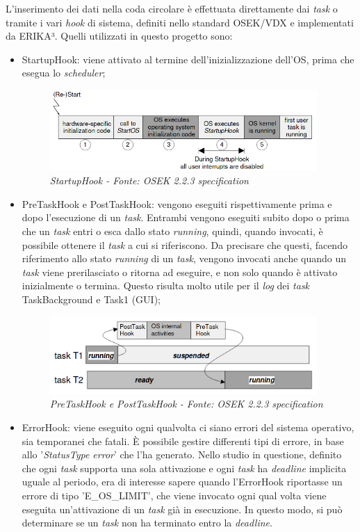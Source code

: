 \documentclass{article}
\begin{document}
L'inserimento dei dati nella coda circolare è effettuata direttamente dai \textit{task} o tramite i vari \textit{hook} di sistema, definiti nello standard OSEK/VDX e implementati da ERIKA³. Quelli utilizzati in questo progetto sono:
\begin{itemize}
	\item StartupHook: viene attivato al termine dell'inizializzazione dell'OS, prima che esegua lo \textit{scheduler};
	\begin{figure}[H]
		\centering
		\includegraphics[width=4in]{image/StartupHook.png}
		\caption{\textit{\textit{StartupHook} - Fonte: OSEK 2.2.3 specification}}
		\label{startup}
	\end{figure}
	\item PreTaskHook e PostTaskHook: vengono eseguiti rispettivamente prima e dopo l'esecuzione di un \textit{task}. Entrambi vengono eseguiti subito dopo o prima che un \textit{task} entri o esca dallo stato \textit{running}, quindi, quando invocati, è possibile ottenere il \textit{task} a cui si riferiscono. Da precisare che questi, facendo riferimento allo stato \textit{running} di un \textit{task}, vengono invocati anche quando un \textit{task} viene prerilasciato o ritorna ad eseguire, e non solo quando è attivato inizialmente o termina. Questo risulta molto utile per il \textit{log} dei \textit{task} TaskBackground e Task1 (GUI);
	\begin{figure}[H]
		\centering
		\includegraphics[width=4in]{image/PrePostTaskHook.png}
		\caption{\textit{\textit{PreTaskHook} e \textit{PostTaskHook} - Fonte: OSEK 2.2.3 specification}}
		\label{taskHook}
	\end{figure}
	\item ErrorHook: viene eseguito ogni qualvolta ci siano errori del sistema operativo, sia temporanei che fatali.  È possibile gestire differenti tipi di errore, in base allo '\textit{StatusType error}' che l'ha generato. Nello studio in questione, definito che ogni \textit{task} supporta una sola attivazione e ogni \textit{task} ha \textit{deadline} implicita uguale al periodo, era di interesse sapere quando l'ErrorHook riportasse un errore di tipo 'E\_OS\_LIMIT', che viene invocato ogni qual volta viene eseguita un'attivazione di un \textit{task} già in esecuzione. In questo modo, si può determinare se un \textit{task} non ha terminato entro la \textit{deadline}.
\end{itemize}
\end{document}

